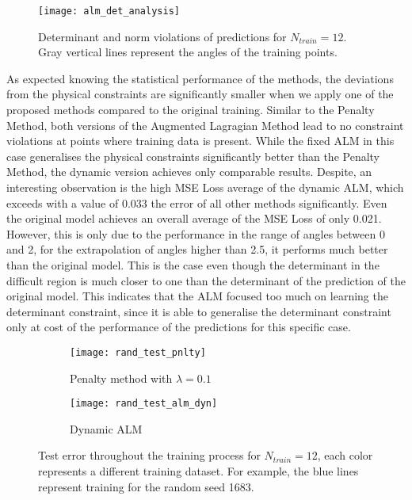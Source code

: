 \begin{figure}[]
	\texttt{[image: alm\_det\_analysis]}
	\caption{Determinant and norm violations of predictions for $N_{train} = 12$. Gray vertical lines represent the angles of the training points.}
	\label{fig:alm_det_analysis}
\end{figure}

As expected knowing the statistical performance of the methods, the deviations from the physical constraints are significantly smaller when we apply one of the proposed methods compared to the original training. Similar to the Penalty Method, both versions of the Augmented Lagragian Method lead to no constraint violations at points where training data is present. While the fixed ALM in this case generalises the physical constraints significantly better than the Penalty Method, the dynamic version achieves only comparable results. Despite, an interesting observation is the high MSE Loss average of the dynamic ALM, which exceeds with a value of 0.033 the error of all other methods significantly. Even the original model achieves an overall average of the MSE Loss of only 0.021. However, this is only due to the performance in the range of angles between 0 and 2, for the extrapolation of angles higher than 2.5, it performs much better than the original model. This is the case even though the determinant in the difficult region is much closer to one than the determinant of the prediction of the original model. This indicates that the ALM focused too much on learning the determinant constraint, since it is able to generalise the determinant constraint only at cost of the performance of the predictions for this specific case.\\
\begin{figure}
	\centering
	\begin{subfigure}{.5\textwidth}
		\centering
		\texttt{[image: rand\_test\_pnlty]}
		\caption{Penalty method with $\lambda = 0.1$}
	\end{subfigure}%
	\begin{subfigure}{.5\textwidth}
		\centering
		\texttt{[image: rand\_test\_alm\_dyn]}
		\caption{Dynamic ALM}
	\end{subfigure}
	\caption{Test error throughout the training process for $N_{train} = 12$, each color represents a different training dataset. For example, the blue lines represent training for the random seed 1683.}
	\label{fig:test_training}
\end{figure}

